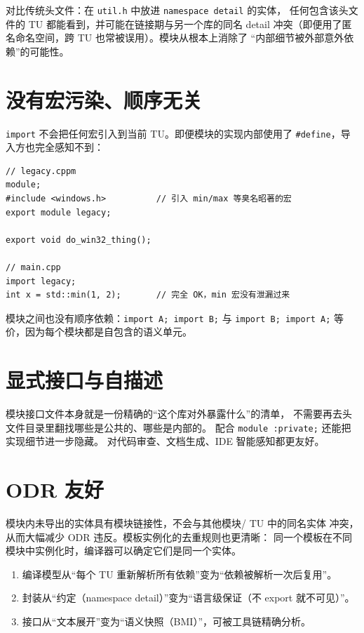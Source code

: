 \documentclass[12pt,a4paper,fontset=fandol]{ctexbook}
\newcommand{\cpplabel}{%
  \tcbox[on line,colback=cppheadbg,colframe=cppheadbg,
    boxrule=0pt,arc=1pt,left=2pt,right=2pt,top=1pt,bottom=1pt,
    colupper=white,fontupper=\scriptsize\bfseries]{C++}}
\newcommand{\flag}[1]{\texttt{#1}}
\begin{document}
对比传统头文件：在 \texttt{util.h} 中放进 \texttt{namespace detail} 的实体，
任何包含该头文件的 TU 都能看到，并可能在链接期与另一个库的同名 detail
冲突（即便用了匿名命名空间，跨 TU 也常被误用）。模块从根本上消除了
“内部细节被外部意外依赖”的可能性。

\section{没有宏污染、顺序无关}

\flag{import} 不会把任何宏引入到当前 TU。即便模块的实现内部使用了
\flag{\#define}，导入方也完全感知不到：

\cpplabel
\begin{lstlisting}[style=cppstyle]
// legacy.cppm
module;
#include <windows.h>          // 引入 min/max 等臭名昭著的宏
export module legacy;

export void do_win32_thing();

// main.cpp
import legacy;
int x = std::min(1, 2);       // 完全 OK，min 宏没有泄漏过来
\end{lstlisting}

模块之间也没有顺序依赖：\flag{import A; import B;} 与
\flag{import B; import A;} 等价，因为每个模块都是自包含的语义单元。

\section{显式接口与自描述}

模块接口文件本身就是一份精确的“这个库对外暴露什么”的清单，
不需要再去头文件目录里翻找哪些是公共的、哪些是内部的。
配合 \flag{module :private;} 还能把实现细节进一步隐藏。
对代码审查、文档生成、IDE 智能感知都更友好。

\section{ODR 友好}

模块内未导出的实体具有模块链接性，不会与其他模块/ TU 中的同名实体
冲突，从而大幅减少 ODR 违反。模板实例化的去重规则也更清晰：
同一个模板在不同模块中实例化时，编译器可以确定它们是同一个实体。

\begin{guideline}[title=Modules 的核心价值]
\begin{enumerate}
  \item 编译模型从“每个 TU 重新解析所有依赖”变为“依赖被解析一次后复用”。
  \item 封装从“约定（namespace detail）”变为“语言级保证（不 export 就不可见）”。
  \item 接口从“文本展开”变为“语义快照（BMI）”，可被工具链精确分析。
\end{enumerate}
\end{guideline}
\end{document}

